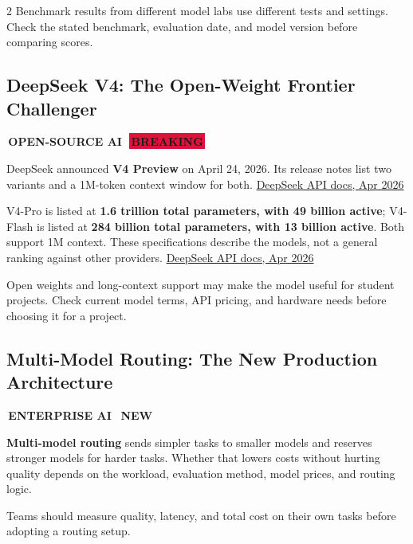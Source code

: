 \documentclass[10pt, a4paper]{article}
\newcommand{\sectiontag}[1]{%
  \noindent\colorbox{cobalt}{%
    \,\footnotesize\bfseries\color{white}\MakeUppercase{#1}\,}\,%
}
\newcommand{\hottag}{%
  \colorbox{crimson}{\,\scriptsize\bfseries\color{white}BREAKING\,}\ %
}
\newcommand{\newtag}{%
  \colorbox{emerald}{\,\scriptsize\bfseries\color{white}NEW\,}\ %
}
\newcommand{\ruled}{%
  \par\vspace{0.3em}%
  \noindent{\color{electric}\rule{\linewidth}{0.4pt}}\par
  \vspace{0.3em}}
\begin{document}
\begin{multicols}{2}
{Benchmark results from different model labs use different tests and settings. Check the stated benchmark, evaluation date, and model version before comparing scores.
}

\columnbreak

\subsection{DeepSeek V4: The Open-Weight Frontier Challenger}

\sectiontag{Open-Source AI}\quad\hottag

\medskip
{\small
DeepSeek announced \textbf{V4 Preview} on April 24, 2026. Its release notes list two variants and a 1M-token context window for both.
\href{https://api-docs.deepseek.com/news/news260424/}{DeepSeek API docs, Apr 2026}

V4-Pro is listed at \textbf{1.6 trillion total parameters, with 49 billion active}; V4-Flash is listed at \textbf{284 billion total parameters, with 13 billion active}. Both support 1M context. These specifications describe the models, not a general ranking against other providers.
\href{https://api-docs.deepseek.com/news/news260424/}{DeepSeek API docs, Apr 2026}
}

\begin{alertbox}[title={\faBolt\quad Why DeepSeek V4 Matters for Pakistan}]
  {\small Open weights and long-context support may make the model useful for student projects. Check current model terms, API pricing, and hardware needs before choosing it for a project.}
\end{alertbox}

\ruled

\subsection{Multi-Model Routing: The New Production Architecture}

\sectiontag{Enterprise AI}\quad\newtag

\medskip
{\small
\textbf{Multi-model routing} sends simpler tasks to smaller models and reserves stronger models for harder tasks. Whether that lowers costs without hurting quality depends on the workload, evaluation method, model prices, and routing logic.

Teams should measure quality, latency, and total cost on their own tasks before adopting a routing setup.
}


\end{multicols}
\end{document}
